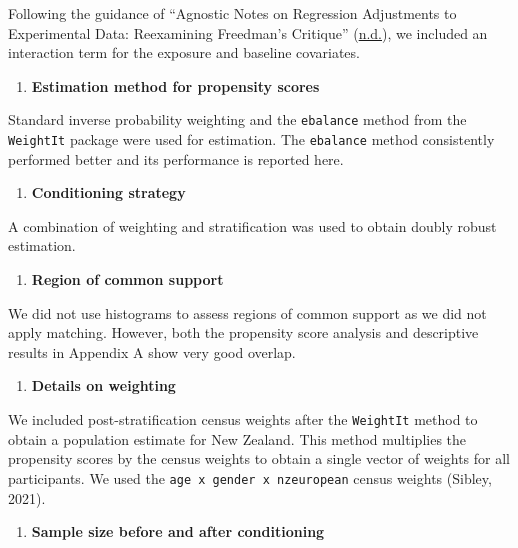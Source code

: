 \documentclass[
  singlecolumn]{report}
\providecommand{\tightlist}{%
  \setlength{\itemsep}{0pt}\setlength{\parskip}{0pt}}\usepackage{longtable,booktabs,array}
\begin{document}
Following the guidance of {``Agnostic Notes on Regression Adjustments to
Experimental Data: Reexamining Freedman{'}s Critique''}
(\protect\hyperlink{ref-agnostic}{n.d.}), we included an interaction
term for the exposure and baseline covariates.

\begin{enumerate}
\def\labelenumi{\arabic{enumi}.}
\setcounter{enumi}{4}
\tightlist
\item
  \textbf{Estimation method for propensity scores}
\end{enumerate}

Standard inverse probability weighting and the \texttt{ebalance} method
from the \texttt{WeightIt} package were used for estimation. The
\texttt{ebalance} method consistently performed better and its
performance is reported here.

\begin{enumerate}
\def\labelenumi{\arabic{enumi}.}
\setcounter{enumi}{4}
\tightlist
\item
  \textbf{Conditioning strategy}
\end{enumerate}

A combination of weighting and stratification was used to obtain doubly
robust estimation.

\begin{enumerate}
\def\labelenumi{\arabic{enumi}.}
\setcounter{enumi}{5}
\tightlist
\item
  \textbf{Region of common support}
\end{enumerate}

We did not use histograms to assess regions of common support as we did
not apply matching. However, both the propensity score analysis and
descriptive results in Appendix A show very good overlap.

\begin{enumerate}
\def\labelenumi{\arabic{enumi}.}
\setcounter{enumi}{6}
\tightlist
\item
  \textbf{Details on weighting}
\end{enumerate}

We included post-stratification census weights after the
\texttt{WeightIt} method to obtain a population estimate for New
Zealand. This method multiplies the propensity scores by the census
weights to obtain a single vector of weights for all participants. We
used the \texttt{age\ x\ gender\ x\ nzeuropean} census weights (Sibley,
2021).

\begin{enumerate}
\def\labelenumi{\arabic{enumi}.}
\setcounter{enumi}{7}
\tightlist
\item
  \textbf{Sample size before and after conditioning}
\end{enumerate}
\end{document}
